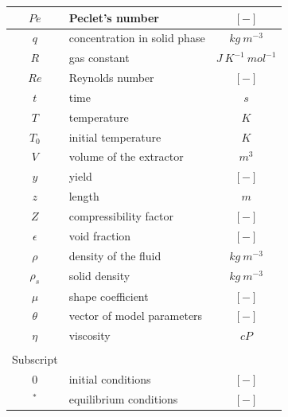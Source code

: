 \documentclass[a4paper,fleqn]{cas-dc}
\begin{document}
\begin{table}[p]
\begin{tabular}{ |c|l|c| }
			$Pe$		&	Peclet's number							& $[-]$						\\ \hline
			$q$			&	concentration in solid phase			& $kg ~ m^{-3}$				\\ \hline
			$R$			&	gas constant							& $J ~ K^{-1} ~ mol^{-1}$	\\ \hline
			$Re$		&	Reynolds number							& $[-]$						\\ \hline
			$t$			&	time									& $s$						\\ \hline
			$T$			&	temperature								& $K$						\\ \hline
			$T_0$		&	initial temperature						& $K$						\\ \hline
			$V$			&	volume of the extractor					& $m^3$						\\ \hline
			$y$			&	yield	 								& $[-]$						\\ \hline
			$z$			&	length									& $m$						\\ \hline
			$Z$			&	compressibility	factor					& $[-]$						\\ \hline
			$\epsilon$	&	void fraction							& $[-]$						\\ \hline
			$\rho$		&	density of the fluid					& $kg ~ m^{-3}$				\\ \hline
			$\rho_s$	&	solid density							& $kg ~ m^{-3}$				\\ \hline
			$\mu$		&	shape coefficient						& $[-]$						\\ \hline
			$\theta$	&	vector of model parameters				& $[-]$						\\ \hline
			$\eta$		&	viscosity								& $cP$						\\ \hline				
						& 											&							\\ \hline			
		 	Subscript	& 											&							\\ \hline
			$0$			&	initial conditions						& $[-]$						\\ \hline
			$^*$		&	equilibrium conditions					& $[-]$						\\ \hline							
		\end{tabular}
\end{table}
\end{document}
